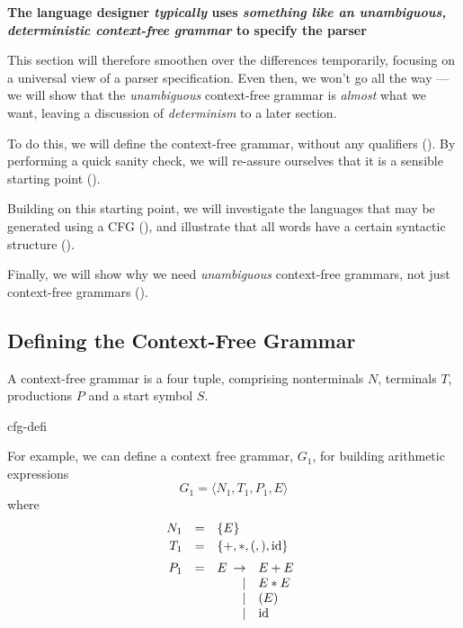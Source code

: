\begin{center}
    \textbf{The language designer \textit{typically} uses \textit{something like an unambiguous, deterministic context-free grammar} to specify the parser}
\end{center}

This section will therefore smoothen over the differences temporarily, focusing on a universal view of a parser specification. Even then, we won't go all the way --- we will show that the \textit{unambiguous} context-free grammar is \textit{almost} what we want, leaving a discussion of \textit{determinism} to a later section.

To do this, we will define the context-free grammar, without any qualifiers (). By performing a quick sanity check, we will re-assure ourselves that it is a sensible starting point (). 

Building on this starting point, we will investigate the languages that may be generated using a CFG (), and illustrate that all words have a certain syntactic structure ().

Finally, we will show why we need \textit{unambiguous} context-free grammars, not just context-free grammars ().

\subsection{Defining the Context-Free Grammar}\label{section:cfg-defn}
A context-free grammar is a four tuple, comprising nonterminals $N$, terminals $T$, productions $P$ and a start symbol $S$. 

\begin{center}
    {cfg-defi}
\end{center}

For example, we can define a context free grammar, $G_1$, for building arithmetic expressions
\[G_1 = \langle N_1,T_1,P_1,E \rangle\]
where
\[
\begin{array}[t]{rcl}
N_1 &=& \{E\}  \\[0.5ex]
T_1 &=& \{+,*,(,),\text{id}\} \\[1.25ex]
P_1 &=& 
  E  \begin{array}[t]{rl}\to & E + E\\
  \mid & E * E\\
  \mid & (E) \\
  \mid & \text{id}
\end{array}
\end{array}
\]
\label{cfg-g1}

